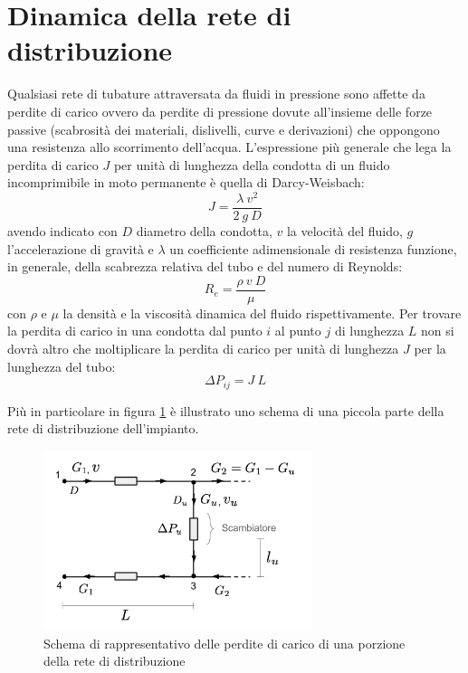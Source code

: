 \documentclass[laurea,oneside,11pt]{USiena_tesiLM}
\begin{document}
\section{Dinamica della rete di distribuzione}
Qualsiasi rete di tubature attraversata da fluidi in pressione sono affette da perdite di carico ovvero da perdite di pressione dovute all'insieme delle forze passive (scabrosità dei materiali, dislivelli, curve e derivazioni) che oppongono una resistenza allo scorrimento dell'acqua. L'espressione più generale che lega la perdita di carico $J$ per unità di lunghezza della condotta di un fluido incomprimibile in moto permanente è quella di Darcy-Weisbach:
\begin{equation}
J = \frac{\lambda \ v^2}{2 \ g \ D}
\end{equation}
avendo indicato con $D$ diametro della condotta, $v$ la velocità del fluido, $g$ l'accelerazione di gravità e $\lambda$ un coefficiente adimensionale di resistenza funzione, in generale, della scabrezza relativa del tubo e del numero di Reynolds:
\begin{equation}
R_e = \frac{\rho \ v \ D}{\mu}
\end{equation}
con $\rho$ e $\mu$ la densità e la viscosità dinamica del fluido rispettivamente. 
Per trovare la perdita di carico in una condotta dal punto $i$ al punto $j$ di lunghezza $L$ non si dovrà altro che moltiplicare la perdita di carico per unità di lunghezza $J$ per la lunghezza del tubo:
\begin{equation}
\Delta P_{ij} = J \ L
\end{equation} 
 
Più in particolare in figura \ref{fig:perdite_carico} è illustrato uno schema di una piccola parte della rete di distribuzione dell'impianto.

\begin{figure}[h]
\centering
\includegraphics[width=0.70\textwidth]{figure/perdite_carico} %
\caption{Schema di rappresentativo delle perdite di carico di una porzione della rete di distribuzione}
\label{fig:perdite_carico}

\end{figure}
\end{document}
